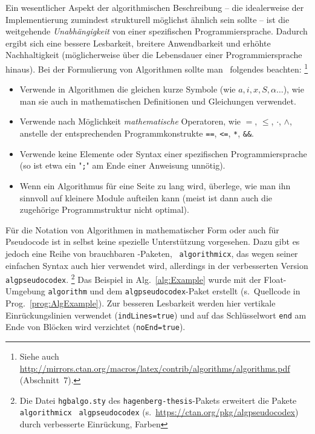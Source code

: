 Ein wesentlicher Aspekt der algorithmischen Beschreibung -- die idealerweise
der Implementierung zumindest strukturell möglichst ähnlich sein sollte --
ist die weitgehende \emph{Unabhängigkeit} von einer spezifischen
Programmiersprache. Dadurch ergibt sich eine bessere Lesbarkeit, breitere
Anwendbarkeit und erhöhte Nachhaltigkeit (möglicherweise über die Lebensdauer
einer Programmiersprache hinaus). Bei der Formulierung von Algorithmen sollte
man \ua\ folgendes beachten:%
\footnote{Siehe auch
\url{http://mirrors.ctan.org/macros/latex/contrib/algorithms/algorithms.pdf}
(Abschnitt~7).}
%
\begin{itemize}
	\item
	Verwende in Algorithmen die gleichen kurze Symbole (wie $a, i, x, S,
	\alpha \ldots$), wie man sie auch in mathematischen Definitionen und
	Gleichungen verwendet.
	\item
	Verwende nach Möglichkeit \emph{mathematische} Operatoren, wie
  $=$, $\leq$, $\cdot$, $\wedge$, \usw
  anstelle der entsprechenden Programmkonstrukte
  \texttt{==}, \texttt{<=}, \texttt{*}, \texttt{\&\&}.
	\item
	Verwende keine Elemente oder Syntax einer spezifischen Programmiersprache
	(so ist etwa ein "\texttt{;}" am Ende einer Anweisung unnötig).
	\item
	Wenn ein Algorithmus für eine Seite zu lang wird, überlege, wie man ihn
	sinnvoll auf kleinere Module aufteilen kann (meist ist dann auch die
	zugehörige Programmstruktur nicht optimal).
\end{itemize}


Für die Notation von Algorithmen in mathematischer Form oder auch für
Pseudo\-code ist in \latex selbst keine spezielle Unterstützung vorgesehen.
Dazu gibt es jedoch eine Reihe von brauchbaren \latex-Paketen, \ua\
\texttt{algorithmicx}, das wegen seiner einfachen Syntax auch hier verwendet
wird, allerdings in der verbesserten Version \texttt{algpseudocodex}.%
\footnote{Die Datei \nolinkurl{hgbalgo.sty} des
\texttt{hagenberg-thesis}-Pakets erweitert die Pakete \texttt{algorithmicx}
\bzw\ \texttt{algpseudocodex} (s.\ \url{https://ctan.org/pkg/algpseudocodex})
durch verbesserte Einrückung, Farben \etc}
%
Das Beispiel in Alg.~\ref{alg:Example} wurde mit der Float-Umgebung
\texttt{algorithm} und dem \texttt{algpseudocodex}-Paket erstellt (s.\
Quellcode in Prog.\ \ref{prog:AlgExample}). Zur besseren Lesbarkeit werden
hier vertikale Einrückungslinien verwendet (\texttt{indLines=true}) und auf
das Schlüsselwort \texttt{end} am Ende von Blöcken wird verzichtet
(\texttt{noEnd=true}).

